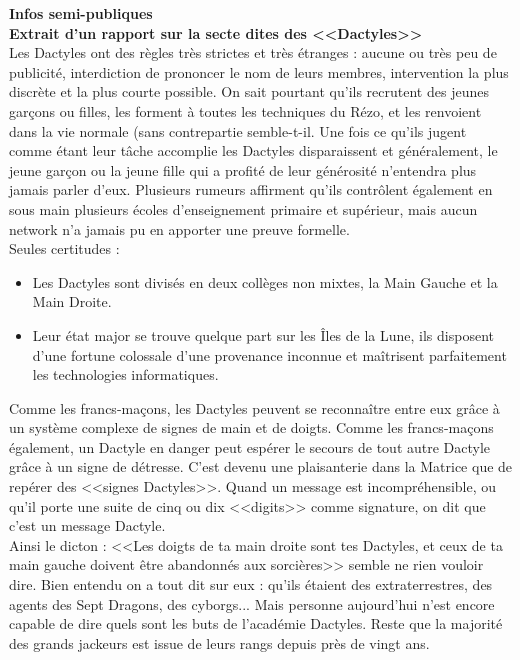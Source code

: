 \documentclass[11pt,twoside,a4paper]{article}
\begin{document}
\begin{multicols}{3}
{\textbf{Infos semi-publiques}~\\

\textbf{Extrait d'un rapport sur la secte dites des <<Dactyles>> }~\\

Les Dactyles ont des r{\`e}gles tr{\`e}s strictes et tr{\`e}s {\'e}tranges : aucune ou tr{\`e}s peu de publicit{\'e}, interdiction de prononcer le nom de leurs membres, intervention la plus discr{\`e}te et la plus courte possible. On sait pourtant qu'ils recrutent des jeunes gar\c{c}ons ou filles, les forment {\`a} toutes les techniques du R{\'e}zo, et les renvoient dans la vie normale (sans contrepartie semble-t-il. Une fois ce qu'ils jugent comme {\'e}tant leur t{\^a}che accomplie les Dactyles disparaissent et g{\'e}n{\'e}ralement, le jeune gar\c{c}on ou la jeune fille qui a profit{\'e} de leur g{\'e}n{\'e}rosit{\'e} n'entendra plus jamais parler d'eux. Plusieurs rumeurs affirment qu'ils contr{\^o}lent {\'e}galement en sous main plusieurs {\'e}coles d'enseignement primaire et sup{\'e}rieur, mais aucun network n'a jamais pu en apporter une preuve formelle.~\\

Seules certitudes :
\begin{itemize}
	\item Les Dactyles sont divis{\'e}s en deux coll{\`e}ges non mixtes, la Main Gauche et la Main Droite. 
	\item Leur {\'e}tat major se trouve quelque part sur les {\^I}les de la Lune, ils disposent d'une fortune colossale d'une provenance inconnue et ma{\^i}trisent parfaitement les technologies informatiques.
\end{itemize}

\columnbreak

Comme les francs-ma\c{c}ons, les Dactyles peuvent se reconna{\^i}tre entre eux gr{\^a}ce {\`a} un syst{\`e}me complexe de signes de main et de doigts. Comme  les francs-ma\c{c}ons {\'e}galement, un Dactyle en danger peut esp{\'e}rer le secours de tout autre Dactyle gr{\^a}ce {\`a} un signe de d{\'e}tresse. C'est devenu une plaisanterie dans la Matrice que de rep{\'e}rer des <<signes Dactyles>>. Quand un message est incompr{\'e}hensible, ou qu'il porte une suite de cinq ou dix <<digits>> comme signature, on dit que c'est un message Dactyle.~\\

Ainsi le dicton : <<Les doigts de ta main droite sont tes Dactyles, et ceux de ta main gauche doivent {\^e}tre abandonn{\'e}s aux sorci{\`e}res>> semble ne rien vouloir dire. Bien entendu on a tout dit sur eux : qu'ils {\'e}taient des extraterrestres, des agents des Sept Dragons, des cyborgs... Mais personne aujourd'hui n'est encore capable de dire quels sont les buts de l'acad{\'e}mie Dactyles. Reste que la majorit{\'e} des grands jackeurs est issue de leurs rangs depuis pr{\`e}s de vingt ans.~\\

}
\end{multicols}
\end{document}
